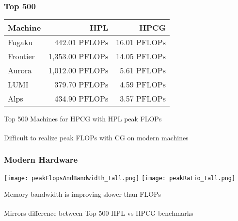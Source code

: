 \documentclass{beamer}
\begin{document}
\begin{frame}
\begin{center}
\frametitle{Top 500}

\begin{table}[ht!]
\begin{center}
\begin{tabular}{l r r}
  \toprule
  Machine  &  HPL  &  HPCG  \\
  \toprule
  Fugaku     &    442.01 PFLOPs  &  16.01 PFLOPs  \\
  Frontier   &  1,353.00 PFLOPs  &  14.05 PFLOPs  \\
  Aurora     &  1,012.00 PFLOPs  &   5.61 PFLOPs  \\
  LUMI       &    379.70 PFLOPs  &   4.59 PFLOPs  \\
  Alps       &    434.90 PFLOPs  &   3.57 PFLOPs  \\
  \bottomrule
\end{tabular}
\end{center}
\end{table}
{\small Top 500 Machines for HPCG with HPL peak FLOPs}\\

~\\

Difficult to realize peak FLOPs with CG on modern machines

\end{center}
\end{frame}


\begin{frame}
\begin{center}
\frametitle{Modern Hardware}

\texttt{[image: peakFlopsAndBandwidth\_tall.png]}
\hspace{1cm}
\texttt{[image: peakRatio\_tall.png]}

Memory bandwidth is improving slower than FLOPs \cite{kruppcomparison}\\

~\\

Mirrors difference between Top 500 HPL vs HPCG benchmarks \cite{meuertop500}\\

\end{center}
\end{frame}

\end{document}
